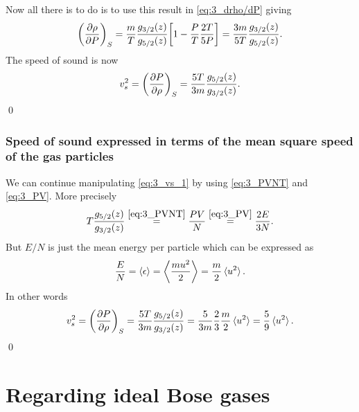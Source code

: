 \documentclass[11pt,letter, swedish, english
]{article}
\begin{document}
Now all there is to do is to use this result in \eqref{eq:3_drho/dP}
giving
\begin{equation}
\qty(\pdv{\rho}{P})_S
=\frac{m}{T}\frac{g_{3/2}(z)}{g_{5/2}(z)}
\qty[1-\frac{P}{T}\frac{2T}{5P}]
=\frac{3m}{5T}\frac{g_{3/2}(z)}{g_{5/2}(z)}.
\end{equation}
The speed of sound is now
\begin{equation}\label{eq:3_vs_1}
v_s^2=\qty(\pdv{P}{\rho})_S
=\frac{5T}{3m}\frac{g_{5/2}(z)}{g_{3/2}(z)}.
\end{equation}
\qed

\subsubsection*{Speed of sound expressed in terms of the mean square
  speed of the gas particles}
We can continue manipulating \eqref{eq:3_vs_1} by using
\eqref{eq:3_PVNT} and \eqref{eq:3_PV}. More precisely
\begin{equation}
T\frac{g_{5/2}(z)}{g_{3/2}(z)}\stackrel{\eqref{eq:3_PVNT}}{=}
\frac{PV}{N}\stackrel{\eqref{eq:3_PV}}{=}
\frac{2E}{3N}.
\end{equation}
But $E/N$ is just the mean energy per particle which can be expressed
as
\begin{equation}
\frac{E}{N}=\ev{\epsilon}=\ev{\frac{mu^2}{2}}
=\frac{m}{2}\ev*{u^2}.
\end{equation}
In other words
\begin{equation}
v_s^2=\qty(\pdv{P}{\rho})_S
=\frac{5T}{3m}\frac{g_{5/2}(z)}{g_{3/2}(z)}
=\frac{5}{3m}\frac{2}{3}\frac{m}{2}\ev*{u^2}
=\frac{5}{9}\ev*{u^2}.
\end{equation}
\qed

\section{Regarding ideal Bose gases }
\end{document}
